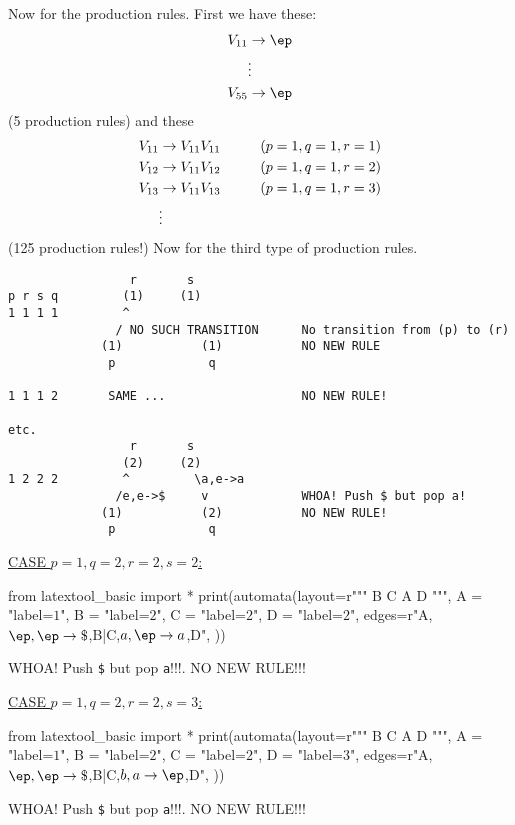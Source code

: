 Now for the production rules.
First we have these:
\begin{align*}
V_{11} &\rightarrow \ep \\
&\vdots \\
V_{55} &\rightarrow \ep \\
\end{align*}
(5 production rules)
and these
\begin{align*}
V_{11} &\rightarrow V_{11} V_{11} \hskip 1cm (p = 1, q = 1, r = 1) \\
V_{12} &\rightarrow V_{11} V_{12} \hskip 1cm (p = 1, q = 1, r = 2) \\
V_{13} &\rightarrow V_{11} V_{13} \hskip 1cm (p = 1, q = 1, r = 3) \\
&\vdots
\end{align*}
(125 production rules!)
Now for the third type of production rules.
\begin{verbatim}
                 r       s
p r s q         (1)     (1)        
1 1 1 1         ^
               / NO SUCH TRANSITION      No transition from (p) to (r)
             (1)           (1)           NO NEW RULE
              p             q

1 1 1 2       SAME ...                   NO NEW RULE!

etc.
                 r       s
                (2)     (2)        
1 2 2 2         ^         \a,e->a
               /e,e->$     v             WHOA! Push $ but pop a!    
             (1)           (2)           NO NEW RULE!
              p             q

\end{verbatim}



\underline{CASE $p=1,q=2,r=2,s=2$:}
\begin{python}
from latextool_basic import *
print(automata(layout=r"""
   B C
A       D
""",
A = "label=$1$",
B = "label=$2$",
C = "label=$2$",
D = "label=$2$",
edges=r"A,$\ep,\ep\rightarrow\$$,B|C,$a,\ep\rightarrow a$,D",
))
\end{python}
WHOA! Push \verb!$! but pop \verb!a!!!!. NO NEW RULE!!!

\underline{CASE $p=1,q=2,r=2,s=3$:}
\begin{python}
from latextool_basic import *
print(automata(layout=r"""
   B C
A       D
""",
A = "label=$1$",
B = "label=$2$",
C = "label=$2$",
D = "label=$3$",
edges=r"A,$\ep,\ep\rightarrow\$$,B|C,$b,a\rightarrow \ep$,D",
))
\end{python}
WHOA! Push \verb!$! but pop \verb!a!!!!. NO NEW RULE!!!



